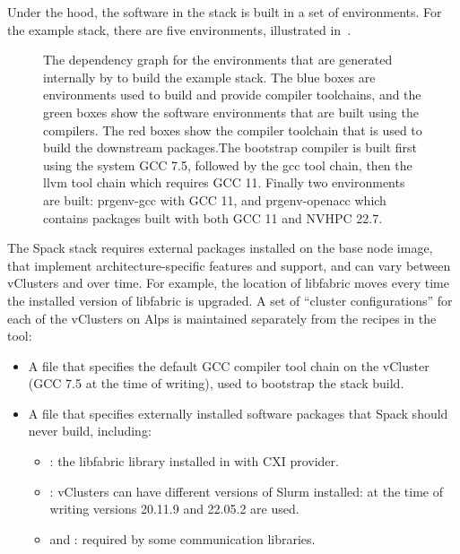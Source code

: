 Under the hood, the software in the stack is built in a set of \spack environments.
For the example stack, there are five environments, illustrated in~.

\begin{figure}[htp!]
    \begin{center}
    
    \end{center}
    \caption{The dependency graph for the \spack environments that are generated internally by \stackinator to build the example \spack stack. The blue boxes are environments used to build and provide compiler toolchains, and the green boxes show the software environments that are built using the compilers. The red boxes show the compiler toolchain that is used to build the downstream packages.\newline The bootstrap compiler is built first using the system GCC 7.5, followed by the gcc tool chain, then the llvm tool chain which requires GCC 11. Finally two environments are built: prgenv-gcc with GCC 11, and prgenv-openacc which contains packages built with both GCC 11 and NVHPC 22.7.}
    \label{fig:env-dag}
\end{figure}

The Spack stack requires external packages installed on the base node image, that implement architecture-specific features and support, and can vary between vClusters and over time.
For example, the location of libfabric moves every time the installed version of libfabric is upgraded.
A set of ``cluster configurations'' for each of the vClusters on Alps is maintained separately from the recipes in the \stackinator tool:
\begin{itemize}
    \item A \spack {} file that specifies the default GCC compiler tool chain on the vCluster (GCC 7.5 at the time of writing), used to bootstrap the \spack stack build.
    \item A \spack {} file that specifies externally installed software packages that Spack should never build, including:
    \begin{itemize}
        \item {}: the libfabric library installed in  with CXI provider.
        \item {}: vClusters can have different versions of Slurm installed: at the time of writing versions 20.11.9 and 22.05.2 are used.
        \item {} and : required by some communication libraries.
    \end{itemize}
\end{itemize}

